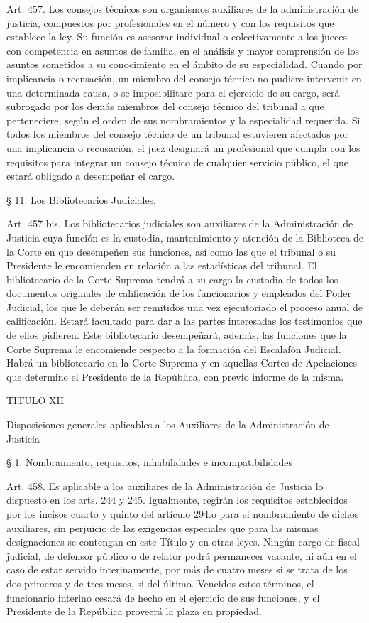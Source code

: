     Art. 457. Los consejos técnicos son organismos auxiliares de la administración de justicia, compuestos por profesionales en el número y con los requisitos que establece la ley. Su función es asesorar individual o colectivamente a los jueces con competencia en asuntos de familia, en el análisis y mayor comprensión de los asuntos sometidos a su conocimiento en el ámbito de su especialidad.
    Cuando por implicancia o recusación, un miembro del consejo técnico no pudiere intervenir en una determinada causa, o se imposibilitare para el ejercicio de su cargo, será subrogado por los demás miembros del consejo técnico del tribunal a que perteneciere, según el orden de sus nombramientos y la especialidad requerida.
    Si todos los miembros del consejo técnico de un tribunal estuvieren afectados por una implicancia o recusación, el juez designará un profesional que cumpla con los requisitos para integrar un consejo técnico de cualquier servicio público, el que estará obligado a desempeñar el cargo.

    § 11. Los Bibliotecarios Judiciales.

    Art. 457 bis. Los bibliotecarios judiciales son auxiliares de la Administración de Justicia cuya función es la custodia, mantenimiento y atención de la Biblioteca de la Corte en que desempeñen sus funciones, así como las que el tribunal o su Presidente le encomienden en relación a las estadísticas del tribunal.
    El bibliotecario de la Corte Suprema tendrá a su cargo la custodia de todos los documentos originales de calificación de los funcionarios y empleados del Poder Judicial, los que le deberán ser remitidos una vez ejecutoriado el proceso anual de calificación. Estará facultado para dar a las partes interesadas los testimonios que de ellos pidieren.
    Este bibliotecario desempeñará, además, las funciones que la Corte Suprema le encomiende respecto a la formación del Escalafón Judicial.
    Habrá un bibliotecario en la Corte Suprema y en aquellas Cortes de Apelaciones que determine el Presidente de la República, con previo informe de la misma.

    TITULO XII

    Disposiciones generales aplicables a los Auxiliares de la Administración de Justicia


    § 1. Nombramiento, requisitos, inhabilidades e incompatibilidades


    Art. 458. Es aplicable a los auxiliares de la Administración de Justicia lo dispuesto en los arts. 244 y 245.
    Igualmente, regirán los requisitos establecidos por los incisos cuarto y quinto del artículo 294.o para el nombramiento de dichos auxiliares, sin perjuicio de las exigencias especiales que para las mismas designaciones se contengan en este Título y en otras leyes.
    Ningún cargo de fiscal judicial, de defensor público o de relator podrá permanecer vacante, ni aún en el caso de estar servido interinamente, por más de cuatro meses si se trata de los dos primeros y de tres meses, si del último. Vencidos estos términos, el funcionario interino cesará de hecho en el ejercicio de sus funciones, y el Presidente de la República proveerá la plaza en propiedad.



